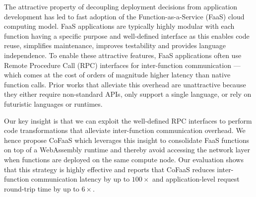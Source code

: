 The attractive property of decoupling deployment decisions from application development has led to fast adoption of the Function-as-a-Service (FaaS) cloud computing model. FaaS applications are typically highly modular with each function having a specific purpose and well-defined interface as this enables code reuse, simplifies maintenance, improves testability and provides language independence. To enable these attractive features, FaaS applications often use Remote Procedure Call (RPC) interfaces for inter-function communication --- which comes at the cost of orders of magnitude higher latency than native function calls. Prior works that alleviate this overhead are unattractive because they either require non-standard APIs, only support a single language, or rely on futuristic languages or runtimes.

Our key insight is that we can exploit the well-defined RPC interfaces to perform code transformations that alleviate inter-function communication overhead. We hence propose CoFaaS which leverages this insight to consolidate FaaS functions on top of a WebAssembly runtime and thereby avoid accessing the network layer when functions are deployed on the same compute node. Our evaluation shows that this strategy is highly effective and reports that CoFaaS reduces inter-function communication latency by up to $100\times$ and application-level request round-trip time by up to $6\times$.

